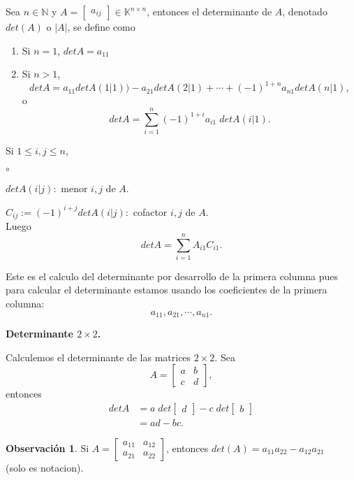 \documentclass{article}
\theoremstyle{definition}
\theoremstyle{definition}
\newtheorem*{obs}{Observación}
\theoremstyle{remark}
\begin{document}
\begin{defi}
  Sea $n \in \mathbb{N}$ y $A=\begin{bmatrix}a_{ij}\end{bmatrix} \in \mathbb{K}^{n \times n}$, entonces el determinante de $A$, denotado $det(A)$ o $|A|$, se define como 
  \begin{enumerate}[label=\arabic*.]
    \item Si $n = 1$, $detA=a_{11}$
    \item Si $ n > 1 $, \[
        detA=a_{11}detA(1|1))-a_{21}detA(2|1)+\cdots+(-1)^{1+n}a_{n1}detA(n|1),
      \]
      o
      \[
        detA=\sum_{i=1}^{n}{(-1)^{1+i}a_{i1}\;detA(i|1)}.
      \]
  \end{enumerate}
\end{defi}
Si $ 1 \leq i,j \leq n$, \begin{list}{$\circ$}{}  
\item $detA(i|j) :$ menor $i,j$ de $A$. 
\item $C_{ij} := (-1)^{i+j}detA(i|j) :$ cofactor $i,j$ de $A$. \\
  Luego \[
    detA=\sum_{i=1}^{n}A_{i1}C_{i1}.
  \]
\end{list}
Este es el calculo del determinante por desarrollo de la primera columna pues para calcular el determinante estamos usando los coeficientes de la primera columna: \[
  a_{11},a_{21},\cdots,a_{n1}.
\]
\begin{center}
\textbf{Determinante $2 \times 2$.}
\end{center}
Calculemos el determinante de las matrices $2 \times 2$. Sea \[
  A=\begin{bmatrix}a & b \\ c & d \end{bmatrix},
\]
entonces \[\begin{aligned}
  detA&=a\;det\begin{bmatrix}d\end{bmatrix}-c\;det\begin{bmatrix}b\end{bmatrix}\\
  &=ad-bc.
\end{aligned}
\]
\begin{obs}
  Si $A=\begin{bmatrix}a_{11} & a_{12} \\ a_{21} & a_{22} \end{bmatrix}$, entonces $det(A)=a_{11}a_{22}-a_{12}a_{21}$\\(solo es notacion).
\end{obs}
\end{document}
